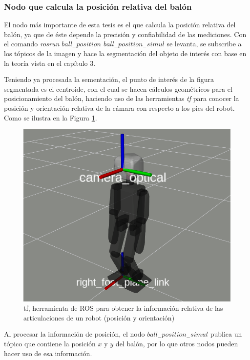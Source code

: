 			\subsubsection*{Nodo que calcula la posición relativa del balón}
			El nodo más importante de esta tesis es el que calcula la posición relativa del balón, ya que de éste depende la precisión y confiabilidad de las mediciones. Con el comando \textit{rosrun $ball_-position$ $ball_-position_-simul$} se levanta, se subscribe a los tópicos de la imagen y hace la segmentación del objeto de interés con base en la teoría vista en el capítulo 3. 
			
			Teniendo ya procesada la sementación, el punto de interés de la figura segmentada es el centroide, con el cual se hacen cálculos geométricos para el posicionamiento del balón, haciendo uso de las herramientas \textit{tf} para conocer la posición y orientación relativa de la cámara con respecto a los pies del robot. Como se ilustra en la Figura \ref{fig:tf}.
			
\begin{figure}
	\centering
	\includegraphics[scale=0.3]{images/tf.png}
	\caption{tf, herramienta de ROS para obtener la información relativa de las articulaciones de un robot (posición y orientación)}
	\label{fig:tf}
\end{figure}
	
			Al procesar la información de posición, el nodo $ball_-position_-simul$ publica un tópico que contiene la posición $x$ y $y$ del balón, por lo que otros nodos pueden hacer uso de esa información.
			
